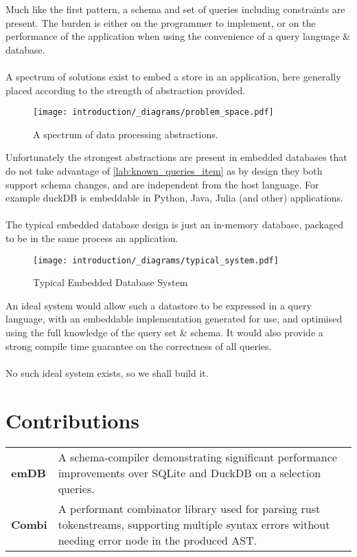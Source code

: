 Much like the first pattern, a schema and set of queries including constraints are present. The
burden is either on the programmer to implement, or on the performance of the application when using the
convenience of a query language \& database.
\\
\\ A spectrum of solutions exist to embed a store in an application, here generally placed according to the strength of abstraction provided.
\begin{figure}[h!]
    \centering
    \texttt{[image: introduction/\_diagrams/problem\_space.pdf]}
    \caption{A spectrum of data processing abstractions.}
\end{figure}
Unfortunately the strongest abstractions are present in embedded databases that do not take advantage of \ref{lab:known_queries_item} as by design
they both support schema changes, and are independent from the host language. For example duckDB is embeddable in Python, Java, Julia (and other)
applications. 
\\
\\The typical embedded database design is just an in-memory database, packaged to be in the same process an application.
\begin{figure}[h!]
    \centering
    \texttt{[image: introduction/\_diagrams/typical\_system.pdf]}
    \caption{Typical Embedded Database System}
\end{figure}
\noindent An ideal system would allow such a datastore to be expressed in a query language, with an embeddable
implementation generated for use, and optimised using the full knowledge of the query set \& schema. It would also provide a strong compile time guarantee on the correctness of all queries.
\\
\\ No such ideal system exists, so we shall build it.

\section{Contributions}
\begin{center}
    \begin{tabular}{l p{}}
        \textbf{emDB} & A schema-compiler demonstrating significant performance improvements over SQLite and DuckDB on a selection queries. \\
        \textbf{Combi} & A performant combinator library used for parsing rust tokenstreams, supporting multiple syntax errors without needing error node in the produced AST. \\
    \end{tabular}
\end{center}